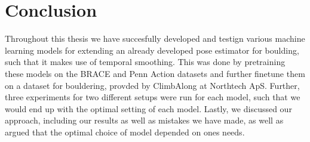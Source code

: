 \documentclass[./main.tex]{subfiles}
\begin{document}
\section{Conclusion}
\label{sec:conclusion}
Throughout this thesis we have succesfully developed and testign various machine learning models for extending an already developed pose estimator for boulding, such that it makes use of temporal smoothing. This was done by pretraining these models on the BRACE and Penn Action datasets and further finetune them on a dataset for bouldering, provded by ClimbAlong at Northtech ApS. Further, three experiments for two different setups were run for each model, such that we would end up with the optimal setting of each model. Lastly, we discussed our approach, including our results as well as mistakes we have made, as well as argued that the optimal choice of model depended on ones needs.
\end{document}
